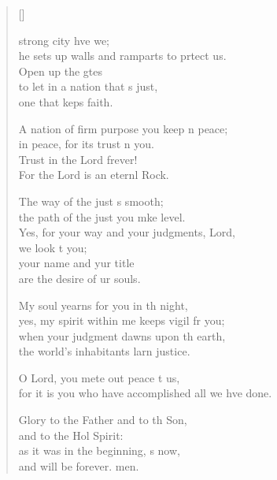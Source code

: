 \settowidth{\versewidth}{for it is you who have accomplished all we have done.}
\begin{verse}[\versewidth]
  \begin{patverse}
 strong city hve we;\Med\\
he sets up walls and ramparts to prtect us.\\
Open up the gtes\Flex\\
to let in a nation that \pointup{\i}s just,\Med\\
one that keps faith.

A nation of firm purpose you keep \pointup{\i}n peace;\Med\\
in peace, for its trust \pointup{\i}n you.\\
Trust in the Lord frever!\Med\\
For the Lord is an eternl Rock.

The way of the just \pointup{\i}s smooth;\Med\\
the path of the just you mke level.\\
Yes, for your way and your judgments,  Lord,\Med\\
we look t you;\\
your name and yur title\Med\\
are the desire of ur souls.

My soul yearns for you in th night,\Med\\
yes, my spirit within me keeps vigil fr you;\\
when your judgment dawns upon th earth,\Med\\
the world’s inhabitants larn justice.

O Lord, you mete out peace t us,\Med\\
for it is you who have accomplished all we hve done.

Glory to the Father and to th Son,\Med\\
and to the Hol Spirit:\\
as it was in the beginning, \pointup{\i}s now,\Med\\
and will be forever. men.
  \end{patverse}
\end{verse}
